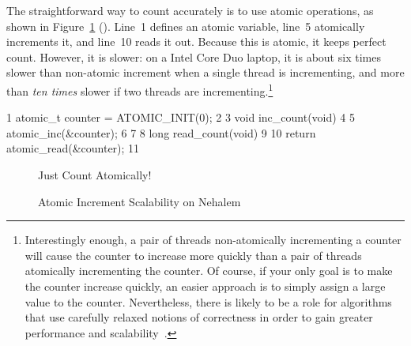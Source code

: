 The straightforward way to count accurately is to use atomic operations,
as shown in
Figure~\ref{fig:count:Just Count Atomically!} ().
Line~1 defines an atomic variable, line~5 atomically increments it, and
line~10 reads it out.
Because this is atomic, it keeps perfect count.
However, it is slower: on a Intel Core Duo laptop, it is about
six times slower than non-atomic increment
when a single thread is incrementing, and more than \emph{ten times}
slower if two threads are incrementing.\footnote{
	Interestingly enough, a pair of threads non-atomically incrementing
	a counter will cause the counter to increase more quickly than
	a pair of threads atomically incrementing the counter.
	Of course, if your only goal is to make the counter increase
	quickly, an easier approach is to simply assign a large value
	to the counter.
	Nevertheless, there is likely to be a role for algorithms that
	use carefully relaxed notions of correctness in order to gain
	greater performance and
	scalability~\cite{Andrews91textbook,Arcangeli03,DavidUngar2011unsync}.}

{ \scriptsize
\begin{verbbox}
  1 atomic_t counter = ATOMIC_INIT(0);
  2 
  3 void inc_count(void)
  4 {
  5   atomic_inc(&counter);
  6 }
  7 
  8 long read_count(void)
  9 {
 10   return atomic_read(&counter);
 11 }
\end{verbbox}
}
\begin{figure}[tbp]
\centering
\theverbbox
\caption{Just Count Atomically!}
\label{fig:count:Just Count Atomically!}
\end{figure}

\begin{figure}[tb]
\begin{center}
\end{center}
\caption{Atomic Increment Scalability on Nehalem}
\label{fig:count:Atomic Increment Scalability on Nehalem}
\end{figure}

